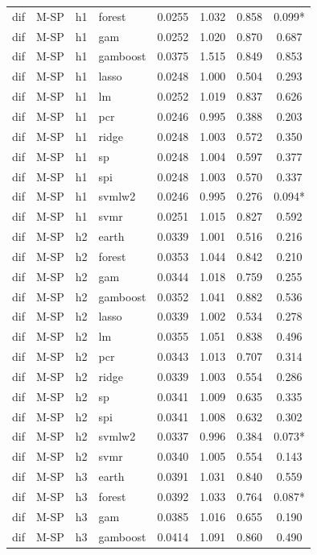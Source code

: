 \begin{ThreePartTable}
\begin{longtable}[t]{llclcccc}
dif & M-SP & h1 & forest & 0.0255 & 1.032 & 0.858 & 0.099*\\
dif & M-SP & h1 & gam & 0.0252 & 1.020 & 0.870 & 0.687\\
dif & M-SP & h1 & gamboost & 0.0375 & 1.515 & 0.849 & 0.853\\
dif & M-SP & h1 & lasso & 0.0248 & 1.000 & 0.504 & 0.293\\
dif & M-SP & h1 & lm & 0.0252 & 1.019 & 0.837 & 0.626\\
dif & M-SP & h1 & pcr & 0.0246 & 0.995 & 0.388 & 0.203\\
dif & M-SP & h1 & ridge & 0.0248 & 1.003 & 0.572 & 0.350\\
dif & M-SP & h1 & sp & 0.0248 & 1.004 & 0.597 & 0.377\\
dif & M-SP & h1 & spi & 0.0248 & 1.003 & 0.570 & 0.337\\
dif & M-SP & h1 & svmlw2 & 0.0246 & 0.995 & 0.276 & 0.094*\\
dif & M-SP & h1 & svmr & 0.0251 & 1.015 & 0.827 & 0.592\\
\addlinespace
dif & M-SP & h2 & earth & 0.0339 & 1.001 & 0.516 & 0.216\\
dif & M-SP & h2 & forest & 0.0353 & 1.044 & 0.842 & 0.210\\
dif & M-SP & h2 & gam & 0.0344 & 1.018 & 0.759 & 0.255\\
dif & M-SP & h2 & gamboost & 0.0352 & 1.041 & 0.882 & 0.536\\
dif & M-SP & h2 & lasso & 0.0339 & 1.002 & 0.534 & 0.278\\
dif & M-SP & h2 & lm & 0.0355 & 1.051 & 0.838 & 0.496\\
dif & M-SP & h2 & pcr & 0.0343 & 1.013 & 0.707 & 0.314\\
dif & M-SP & h2 & ridge & 0.0339 & 1.003 & 0.554 & 0.286\\
dif & M-SP & h2 & sp & 0.0341 & 1.009 & 0.635 & 0.335\\
dif & M-SP & h2 & spi & 0.0341 & 1.008 & 0.632 & 0.302\\
dif & M-SP & h2 & svmlw2 & 0.0337 & 0.996 & 0.384 & 0.073*\\
dif & M-SP & h2 & svmr & 0.0340 & 1.005 & 0.554 & 0.143\\
\addlinespace
dif & M-SP & h3 & earth & 0.0391 & 1.031 & 0.840 & 0.559\\
dif & M-SP & h3 & forest & 0.0392 & 1.033 & 0.764 & 0.087*\\
dif & M-SP & h3 & gam & 0.0385 & 1.016 & 0.655 & 0.190\\
dif & M-SP & h3 & gamboost & 0.0414 & 1.091 & 0.860 & 0.490\\

\end{longtable}
\end{ThreePartTable}
